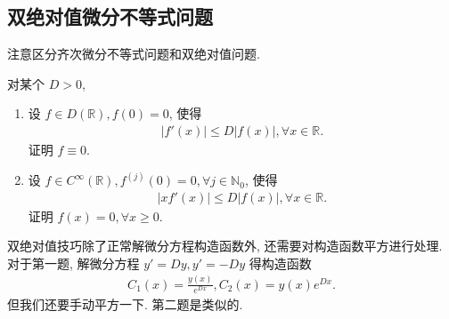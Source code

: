 \documentclass[../../main.tex]{subfiles}%
\begin{document}
\subsection{双绝对值微分不等式问题}\label{subsection:双绝对值问题}

注意区分齐次微分不等式问题和双绝对值问题.

\begin{example}\label{example:双绝对值经典问题}
对某个 $D > 0$,
\begin{enumerate}
\item 设 $f\in D(\mathbb{R}),f(0)=0$, 使得
\begin{align}\label{equation-----1229}
|f'(x)|\leqslant D|f(x)|,\forall x\in\mathbb{R}.
\end{align}
证明 $f\equiv0$.

\item 设 $f\in C^\infty(\mathbb{R}),f^{(j)}(0)=0,\forall j\in\mathbb{N}_0$, 使得
\begin{align}\label{equation-----1230}
|xf'(x)|\leqslant D|f(x)|,\forall x\in\mathbb{R}.
\end{align}
证明 $f(x)=0,\forall x\geqslant0$.
\end{enumerate}
\end{example}
\begin{note}
双绝对值技巧除了正常解微分方程构造函数外, 还需要对构造函数平方进行处理. 对于第一题, 解微分方程 $y' = Dy,y' = -Dy$ 得构造函数
\begin{align*}
C_1(x)=\frac{y(x)}{e^{Dx}},C_2(x)=y(x)e^{Dx}.
\end{align*}
但我们还要手动平方一下. 第二题是类似的.
\end{note}
\end{document}

